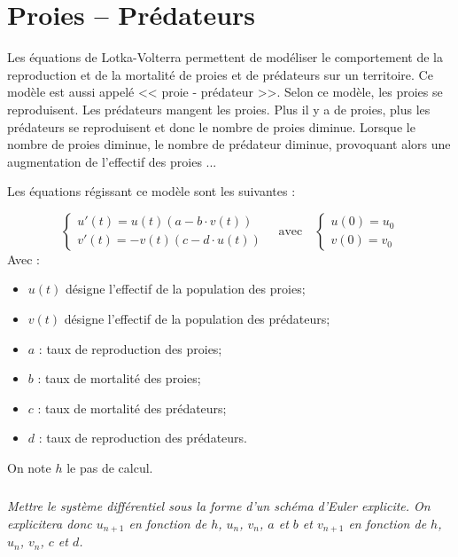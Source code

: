 \documentclass[10pt]{article}
\begin{document}




\section{Proies -- Prédateurs}
Les équations de Lotka-Volterra permettent de modéliser le comportement de la reproduction et de la mortalité de proies et de prédateurs sur un territoire. Ce modèle est aussi appelé << proie - prédateur >>. Selon ce modèle, les proies se reproduisent. Les prédateurs mangent les proies. Plus il y a de proies, plus les prédateurs se reproduisent et donc le nombre de proies diminue.  Lorsque le nombre de proies diminue, le nombre de prédateur diminue, provoquant alors une augmentation de l'effectif des proies ...

Les équations régissant ce modèle sont les suivantes :

$$
\left\{
\begin{array}{l}
u'(t)=u(t)\left(a-b\cdot v(t) \right)\\
v'(t)=-v(t)\left(c-d\cdot u(t) \right)
\end{array}
\right.
\quad
\text{avec}
\quad
\left\{
\begin{array}{l}
u(0) = u_0\\
v(0) = v_0
\end{array}
\right.$$
Avec : 
\begin{itemize}
\item $u(t)$ désigne l'effectif de la population des proies;
\item $v(t)$ désigne l'effectif de la population des prédateurs;
\item $a$ : taux de reproduction des proies;
\item $b$ : taux de mortalité des proies;
\item $c$ : taux de mortalité des prédateurs; 
\item $d$ : taux de reproduction des prédateurs.
\end{itemize}

On note $h$ le pas de calcul. 

\subparagraph{}
\textit{Mettre le système différentiel sous la forme d'un schéma d'Euler explicite. On explicitera donc $u_{n+1}$ en fonction de $h$, $u_n$, $v_n$, $a$ et $b$ et $v_{n+1}$ en fonction de $h$, $u_n$, $v_n$, $c$ et $d$.}
\end{document}
